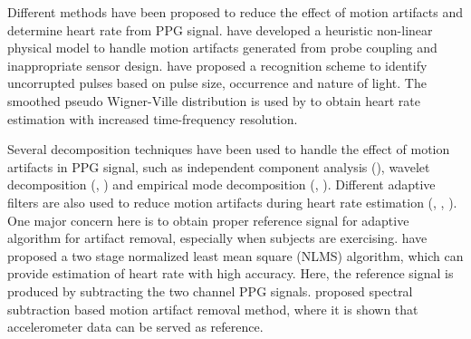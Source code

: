\documentclass[final,3p,times,authoryear]{elsarticle}
\begin{document}
Different methods have been proposed to reduce the effect of motion artifacts and determine heart rate from PPG signal. \cite{bib:Hayes} have developed a heuristic non-linear physical model to handle motion artifacts generated from probe coupling and inappropriate sensor design. \cite{bib:Patent1} have proposed a recognition scheme to identify uncorrupted pulses based on pulse size, occurrence and nature of light. The smoothed pseudo Wigner-Ville distribution is used by \cite{bib:SPWVD} to obtain heart rate estimation with increased time-frequency resolution.
 

Several decomposition techniques have been used to handle the effect of motion artifacts in PPG signal, such as independent component analysis (\cite{bib:ICA}), wavelet decomposition (\cite{bib:wavelet1}, \cite{bib:wavelet2}) and empirical mode decomposition (\cite{bib:EMD1}, \cite{bib:EMD2}). Different adaptive filters  are also used to reduce motion  artifacts during heart rate estimation (\cite{bib:kalman1}, \cite{bib:ANC2}, \cite{bib:NLMS}). One major concern here is to obtain proper reference signal for adaptive algorithm for artifact removal, especially when subjects are exercising. \cite{bib:NLMS} have proposed a two stage normalized least mean square (NLMS) algorithm, which can provide estimation of heart rate with high accuracy. Here, the reference signal is produced by subtracting the two channel PPG signals. \cite{bib:Spectrum} proposed spectral subtraction based motion artifact removal method, where it is shown that accelerometer data can be served as reference.  
\end{document}
